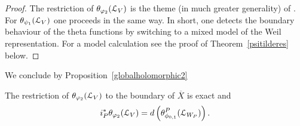 \begin{proof}
The restriction of $\theta_{\varphi_2}(\mathcal{L}_V)$ is the theme (in
much greater generality) of \cite{FMres}. For $\theta_{\psi_1}(\mathcal{L}_V)$
one proceeds in the same way. In short, one detects the boundary
behaviour of the theta functions by switching to a mixed model of
the Weil representation. For a model calculation see the proof of
Theorem~\ref{psitilderes} below.
 \begin{comment}
 We assume for simplicity that $L = \Z u + L_W + \Z u'$ and that
 $h=0$. We first note that it suffices to consider the limit $t \to
 \infty$ for $z=z(t,0,0)$.  We have for the Gaussian $\varphi_0(x,z)
 = \exp\left(-\pi[ t^{-2}y_1^2+ 2q(x')+t^2y_1'^2]\right)$ with $x
 = y_1u+x'+y_1'u' \in V$, where $x' \in W$. Hence when taking the
 limit $t \to \infty$ all components of $\theta(\tau,\psi_1^V,\calL_V)$
 vanish unless $y'=0$. We can also ignore the summation over $L_W$
 for the moment, since it is unaffected by $t$. One then applies
 Poisson summation on the sum over $y_1$ to apply the result.
Hence it suffices to consider for fixed $x' \in W$ the sum
\begin{align*} 
\sum_{k \in \Z} \psi(ku+x',z(t,s,w)) & = 
\sum_{k \in \Z} -\frac12t^{-1}k(x,x(s)) \exp\left(-\pi[ t^{-2}k^2+ 2q(x')]\right) \frac{dt}{t}  \\
& + \sum_{k \in \Z} \frac12t^{-2}k^2\exp\left(-\pi[ t^{-2}k^2+ 2q(x')]\right)  \frac{1}{\sqrt{2}} \frac{dw_3}{ts?} \\
&+ \sum_{k \in \Z} -(x,x'(s))(x,x(s)) \exp\left(-\pi[ t^{-2}k^2+ 2q(x')]\right)  \frac{1}{\sqrt{2}} \frac{dw_2}{ts?} \\
& + \sum_{k \in \Z} -\frac12t^{-1}k(x,x'(s) \exp\left(-\pi[ t^{-2}k^2+ 2q(x')]\right) {ds}.
\end{align*}
Applying Poisson summation then yields
\begin{align*} 
\sum_{k \in \Z} \psi(ku+x',z(t,s,w)) & = 
\sum_{k \in \Z} -\frac12tk(x,x(s)) \exp\left(-\pi[ t^{2}k^2+ 2q(x')]\right) {dt}  \\
& + \sum_{k \in \Z} \frac12(2t^{2}k^2-\frac1{\pi}) \exp\left(-\pi[ t^{2}k^2+ 2q(x')]\right)  \frac{1}{\sqrt{2}} \frac{dw_3}{s?} \\
&+ \sum_{k \in \Z} -(x,x'(s))(x,x(s)) \exp\left(-\pi[ t^{2}k^2+ 2q(x')]\right)  \frac{1}{\sqrt{2}} \frac{dw_2}{s?} \\
& + \sum_{k \in \Z} -\frac12t^2k(x,x'(s)) \exp\left(-\pi[ t^{2}k^2+ 2q(x')]\right) {ds}.
\end{align*}
Now taking the limit $t \to \infty$ gives the claim. {\bf CHECK THE SIGN!}
\end{comment}
\end{proof}

We conclude by Proposition~\ref{globalholomorphic2}

\begin{theorem}\label{globalexact}

The restriction of $\theta_{\varphi_2}(\mathcal{L}_V)$ to the boundary of $\overline{X}$ is exact and
\[
i_P^{\ast} \theta_{\varphi_2}( \mathcal{L}_V) = d\left(  \theta^P_{\phi_{0,1}}(\mathcal{L}_{W_P}) \right). 
\]
\end{theorem}

